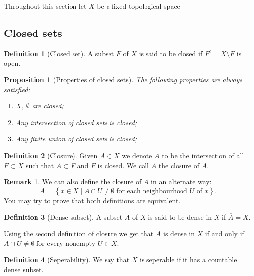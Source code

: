 \documentclass[11pt,a4paper]{article}
\theoremstyle{definition}
\newtheorem{definition}{Definition}[section]
\newtheorem{remark}{Remark}[section]
\theoremstyle{plain}
\newtheorem{proposition}[theorem]{Proposition}
\newcommand{\set}[2]{ \left\{ #1 \mid #2 \right\} }
\begin{document}
  Throughout this section let $X$ be a fixed topological space.
  
  \subsection{Closed sets}

  \begin{definition}[Closed set]
    A subset $F$ of $X$ is said to be closed if $F^c = X \setminus F$ is open.
  \end{definition}

  \begin{proposition}[Properties of closed sets]
    The following properties are always satisfied:
    \begin{enumerate}
      \item[(1)] $X$, $\emptyset$ are closed;
      \item[(2)] Any intersection of closed sets is closed;
      \item[(3)] Any finite union of closed sets is closed;
    \end{enumerate}
  \end{proposition}

  \begin{definition}[Closure]
    Given $A \subset X$ we denote $\overline{A}$ to be the intersection of
    all $F \subset X$ such that $A \subset F$ and $F$ is closed. We call
    $\overline{A}$ the closure of $A$.
  \end{definition}

  \begin{remark}\label{rmk:closure}
    We can also define the closure of $A$ in an alternate way:
    \[
      \overline{A} = \set{x \in X}{A \cap U \neq \emptyset \;\text{for each 
      neighbourhood $U$ of $x$}}.
    \]
    You may try to prove that both definitions are equivalent.
  \end{remark}

  \begin{definition}[Dense subset]
    A subset $A$ of $X$ is said to be dense in $X$ if $\overline{A} = X$.
  \end{definition}

  Using the second definition of closure we get that $A$ is dense in $X$
  if and only if $A \cap U \neq \emptyset$ for every nonempty $U \subset X$.

  \begin{definition}[Seperability]
    We say that $X$ is seperable if it has a countable dense subset.
  \end{definition}
\end{document}
